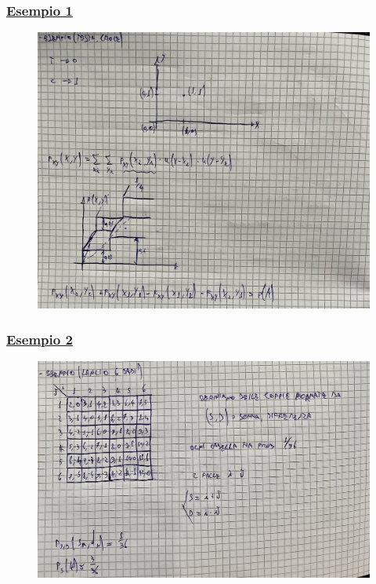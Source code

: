 \documentclass{article}
\begin{document}
\subsubsection{\underline{Esempio 1}}
\begin{figure}[ht]
\centering
\includegraphics[scale=0.14]{ese/42.jpeg}
\end{figure} 
\subsubsection{\underline{Esempio 2}}
\begin{figure}[ht]
\centering
\includegraphics[scale=0.14]{ese/43.jpeg}
\end{figure} 
\end{document}
